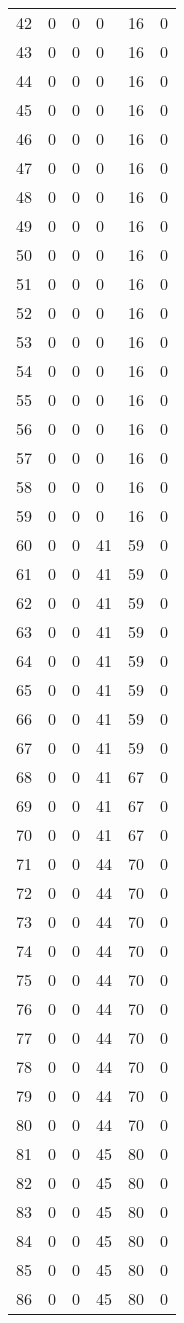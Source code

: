 \documentclass[a4paper]{ctexart}
\begin{document}
\begin{longtable}{p{1cm}|p{2cm}|p{2cm}|p{2cm}|P{2cm}|p{2cm}}
		42&0&0&0&16&0\\
		43&0&0&0&16&0\\
		44&0&0&0&16&0\\
		45&0&0&0&16&0\\
		46&0&0&0&16&0\\
		47&0&0&0&16&0\\
		48&0&0&0&16&0\\
		49&0&0&0&16&0\\
		50&0&0&0&16&0\\
		51&0&0&0&16&0\\
		52&0&0&0&16&0\\
		53&0&0&0&16&0\\
		54&0&0&0&16&0\\
		55&0&0&0&16&0\\
		56&0&0&0&16&0\\
		57&0&0&0&16&0\\
		58&0&0&0&16&0\\
		59&0&0&0&16&0\\
		60&0&0&41&59&0\\
		61&0&0&41&59&0\\
		62&0&0&41&59&0\\
		63&0&0&41&59&0\\
		64&0&0&41&59&0\\
		65&0&0&41&59&0\\
		66&0&0&41&59&0\\
		67&0&0&41&59&0\\
		68&0&0&41&67&0\\
		69&0&0&41&67&0\\
		70&0&0&41&67&0\\
		71&0&0&44&70&0\\
		72&0&0&44&70&0\\
		73&0&0&44&70&0\\
		74&0&0&44&70&0\\
		75&0&0&44&70&0\\
		76&0&0&44&70&0\\
		77&0&0&44&70&0\\
		78&0&0&44&70&0\\
		79&0&0&44&70&0\\
		80&0&0&44&70&0\\
		81&0&0&45&80&0\\
		82&0&0&45&80&0\\
		83&0&0&45&80&0\\
		84&0&0&45&80&0\\
		85&0&0&45&80&0\\
		86&0&0&45&80&0\\

\end{longtable}
\end{document}
